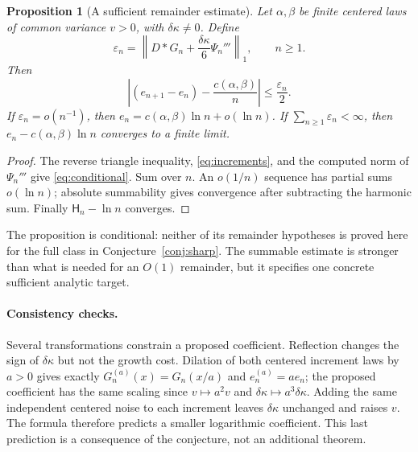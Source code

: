 \documentclass[11pt,a4paper]{article}
\newtheorem{proposition}[theorem]{Proposition}
\numberwithin{equation}{section}
\begin{document}
\begin{proposition}[A sufficient remainder estimate]\label{prop:criterion}
Let $\alpha,\beta$ be finite centered laws of common variance $v>0$,
with $\delta\kappa\ne0$. Define
\[
\varepsilon_n=\left\|D*G_n+\frac{\delta\kappa}{6}\Psi_n'''\right\|_1,
\qquad n\ge1.
\]
Then
\begin{equation}\label{eq:conditional}
\left|(e_{n+1}-e_n)-\frac{c(\alpha,\beta)}n\right|
\le\frac{\varepsilon_n}{2}.
\end{equation}
If $\varepsilon_n=o(n^{-1})$, then
$e_n=c(\alpha,\beta)\ln n+o(\ln n)$.
If $\sum_{n\ge1}\varepsilon_n<\infty$, then
$e_n-c(\alpha,\beta)\ln n$ converges to a finite limit.
\end{proposition}
\begin{proof}
The reverse triangle inequality, \eqref{eq:increments}, and the computed
norm of $\Psi_n'''$ give \eqref{eq:conditional}. Sum over $n$.
An $o(1/n)$ sequence has partial sums $o(\ln n)$; absolute summability
gives convergence after subtracting the harmonic sum. Finally
$\mathsf H_n-\ln n$ converges.
\end{proof}
The proposition is conditional: neither of its remainder hypotheses is
proved here for the full class in Conjecture~\ref{conj:sharp}.
The summable estimate is stronger than what is needed for an $O(1)$
remainder, but it specifies one concrete sufficient analytic target.

\paragraph{Consistency checks.}
Several transformations constrain a proposed coefficient. Reflection
changes the sign of $\delta\kappa$ but not the growth cost. Dilation of
both centered increment laws by $a>0$ gives exactly
$G_n^{(a)}(x)=G_n(x/a)$ and $e_n^{(a)}=ae_n$; the proposed coefficient
has the same scaling since $v\mapsto a^2v$ and
$\delta\kappa\mapsto a^3\delta\kappa$.
Adding the same independent centered noise to each increment leaves
$\delta\kappa$ unchanged and raises $v$. The formula therefore predicts
a smaller logarithmic coefficient. This last prediction is a consequence
of the conjecture, not an additional theorem.
\end{document}
